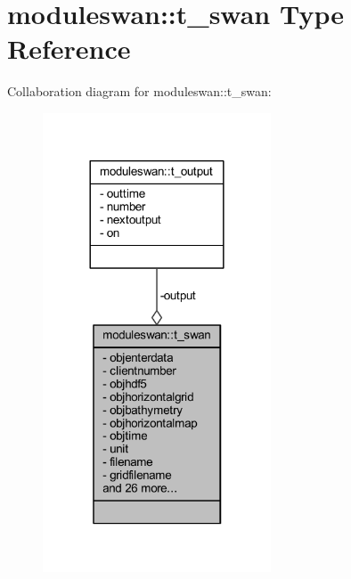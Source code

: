 \hypertarget{structmoduleswan_1_1t__swan}{}\section{moduleswan\+:\+:t\+\_\+swan Type Reference}
\label{structmoduleswan_1_1t__swan}


Collaboration diagram for moduleswan\+:\+:t\+\_\+swan\+:\nopagebreak
\begin{figure}[H]
\begin{center}
\leavevmode
\includegraphics[width=192pt]{structmoduleswan_1_1t__swan__coll__graph}
\end{center}
\end{figure}
